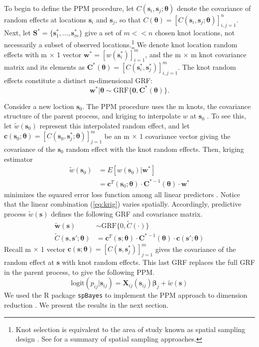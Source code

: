 To begin to define the PPM procedure, let $C(\pmb{s}_{i}, \pmb{s}_{j}; \pmb{\theta})$ denote the covariance of random effects at locations $\pmb{s}_{i}$ and $\pmb{s}_{j}$, so that $C(\pmb{\theta}) = [C(\pmb{s}_{i}, \pmb{s}_{j}; \pmb{\theta})]_{i,j=1}^{n}$. Next, let $\pmb{S}^{*} = \{\pmb{s}_{1}^{*}, \dots, \pmb{s}_{m}^{*}\}$ give a set of $m << n$ chosen knot locations, not necessarily a subset of observed locations.\footnote{Knot selection is equivalent to the area of study known as spatial sampling design \citep{Finley2009}. See \citep{Xia2006} for a summary of spatial sampling approaches.} We denote knot location random effects with m $\times$ 1 vector $\pmb{w}^{*} = \left[w(\pmb{s}_{i}^{*})\right]_{i=1}^{m}$, and the m $\times$ m knot covariance matrix and its elements as $\pmb{C}^{*}(\pmb{\theta}) = \left[C(\pmb{s}_{i}^{*}, \pmb{s}_{j}^{*})\right]_{i,j = 1}^{m}$. The knot random effects constitute a distinct m-dimensional GRF:
\begin{equation}
\pmb{w}^{*}|\pmb{\theta} \sim \text{GRF}\{\pmb{0}, \pmb{C}^{*}(\pmb{\theta})\}.
\end{equation}

Consider a new loction $\pmb{s}_{0}$. The PPM procedure uses the m knots, the covariance structure of the parent process, and kriging to interpolate $w$ at $\pmb{s}_{0}$ \citep{Schabenberger2004}. To see this, let $\tilde{w}(\pmb{s}_{0})$ represent this interpolated random effect, and let $\pmb{c}(\pmb{s}_{0};\pmb{\theta}) = \left[C(\pmb{s}_{0}, \pmb{s}_{j}^{*}; \pmb{\theta})\right]_{j = 1}^{m}$ be an m $\times$ 1 covariance vector giving the covariance of the $\pmb{s}_{0}$ random effect with the knot random effects. Then,  kriging estimator
\begin{align}
\tilde{w}(\pmb{s}_{0}) &= E[w(\pmb{s}_{0})|\pmb{w}^{*}] \\ 
&= \pmb{c}^{T}(\pmb{s}_{0};\pmb{\theta}) \cdot \pmb{C}^{*-1}(\pmb{\theta}) \cdot \pmb{w}^{*} \label{eq:krig}
\end{align}
minimizes the squared error loss function among all linear predictors \citep{Schabenberger2004}. Notice that the linear combination (\ref{eq:krig}) varies spatially. Accordingly, predictive process $\tilde{w}(\pmb{s})$ defines the following GRF and covariance matrix.
\begin{align}
\tilde{\pmb{w}}(\pmb{s}) &\sim \text{GRF}\{0, \tilde{C}(\cdot)\} \\
\tilde{C}(\pmb{s}, \pmb{s}'; \pmb{\theta}) &= \pmb{c}^{T}(\pmb{s};\pmb{\theta}) \cdot \pmb{C}^{*-1}(\pmb{\theta}) \cdot \pmb{c}(\pmb{s}';\pmb{\theta})
\end{align}
Recall m $\times$ 1 vector $\pmb{c}(\pmb{s};\pmb{\theta}) = \left[C(\pmb{s}, \pmb{s}_{j}^{*})\right]_{j = 1}^{m}$ gives the covariance of the random effect at $\pmb{s}$ with knot random effects. This last GRF replaces the full GRF in the parent process, to give the following PPM.
\begin{equation}
\text{logit}(p_{ij}|\pmb{s}_{ij}) = \pmb{X}_{ij}(\pmb{s}_{ij}) \pmb{\beta}_{j} + \tilde{w}(\pmb{s})
\end{equation}
We used the R package \verb|spBayes| to implement the PPM approach to dimension reduction \citep{Finley2013}. We present the results in the next section.

